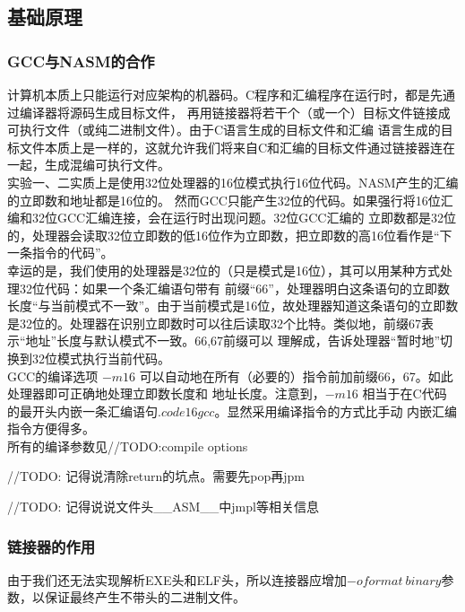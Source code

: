 \documentclass[a4paper]{article}
\begin{document}
    \subsection{基础原理}
    \subsubsection{GCC与NASM的合作}
    计算机本质上只能运行对应架构的机器码。C程序和汇编程序在运行时，都是先通过编译器将源码生成目标文件，
    再用链接器将若干个（或一个）目标文件链接成可执行文件（或纯二进制文件）。由于C语言生成的目标文件和汇编
    语言生成的目标文件本质上是一样的，这就允许我们将来自C和汇编的目标文件通过链接器连在一起，生成混编可执行文件。\\
    
    实验一、二实质上是使用32位处理器的16位模式执行16位代码。NASM产生的汇编的立即数和地址都是16位的。
    然而GCC只能产生32位的代码。如果强行将16位汇编和32位GCC汇编连接，会在运行时出现问题。32位GCC汇编的
    立即数都是32位的，处理器会读取32位立即数的低16位作为立即数，把立即数的高16位看作是``下一条指令的代码''。\\

    幸运的是，我们使用的处理器是32位的（只是模式是16位），其可以用某种方式处理32位代码：如果一个条汇编语句带有
    前缀``66''，处理器明白这条语句的立即数长度``与当前模式不一致''。由于当前模式是16位，故处理器知道这条语句的立即数
    是32位的。处理器在识别立即数时可以往后读取32个比特。类似地，前缀67表示``地址''长度与默认模式不一致。66,67前缀可以
    理解成，告诉处理器``暂时地''切换到32位模式执行当前代码。 \\

    GCC的编译选项 $-m16$ 可以自动地在所有（必要的）指令前加前缀66，67。如此处理器即可正确地处理立即数长度和
    地址长度。注意到，$-m16 $ 相当于在C代码的最开头内嵌一条汇编语句$.code16gcc$。显然采用编译指令的方式比手动
    内嵌汇编指令方便得多。\\
    
    所有的编译参数见//TODO:compile options
   
    //TODO: 记得说清除return的坑点。需要先pop再jpm

    //TODO: 记得说说文件头__ASM__中jmpl等相关信息
    \subsubsection{链接器的作用}
    由于我们还无法实现解析EXE头和ELF头，所以连接器应增加$-oformat \  binary$参数，以保证最终产生不带头的二进制文件。\\
    
\end{document}
